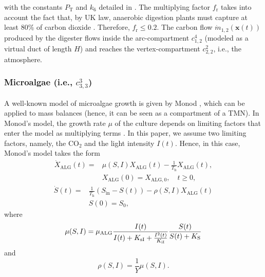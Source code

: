 \documentclass[lettersize,journal]{IEEEtran}
\begin{document}
with the constants $P_{\text{T}}$ and $k_6$ detailed in \cite{bernard2001dynamical,campos2019hybrid}. The multiplying factor $f_\text{r}$ takes into account the fact that, by UK law, anaerobic digestion plants must capture at least 80\% of carbon dioxide \cite{UKlawDigesters}. Therefore, $f_\text{r} \leq 0.2$. The carbon flow $\dot{m}_{1,2}(\bm{x}(t))$ produced by the digester flows inside the arc-compartment $c_{1,2}^4$ (modeled as a virtual duct of length $H$) and reaches the vertex-compartment $c^2_{2,2}$, i.e., the atmosphere. 






  
\subsubsection{Microalgae (i.e., $c^3_{3,3}$)}
A well-known model of microalgae growth is given by Monod \cite{vatcheva2006experiment}, which can be applied to mass balances \cite{marcos2004output} (hence, it can be seen as a compartment of a TMN). In Monod's model, the growth rate $\mu$ of the culture depends on limiting factors that enter the model as multiplying terms \cite{solimeno2015new}. In this paper, we assume two limiting factors, namely, the $\text{CO}_2$ and the light intensity $I(t)$. Hence, in this case, Monod's model takes the form     
\begin{equation}
\begin{aligned}
\dot{X}_{\text{ALG}}(t) = {} & \mu(S, I)X_{\text{ALG}}(t) - \frac{1}{T_{\text{h}}}X_{\text{ALG}}(t), \label{eq:MonodEq1}\\
& X_{\text{ALG}}(0) = X_{\text{ALG},0}, \quad t \geq 0,
\end{aligned}
\end{equation}
\begin{equation}
\begin{aligned}
\dot{S}(t) = {} & \frac{1}{T_{\text{h}}}\left(S_{\text{in}} - S(t) \right) - \rho(S, I)X_{\text{ALG}}(t)  \\
& S(0) = S_0,
\end{aligned}
\end{equation}
where
\begin{equation}\label{eq:MonodGrowthRate}
\mu(S, I) = \mu_{\text{ALG}} \frac{I(t)}{I(t) + K_{\text{sI}} + \frac{I^2(t)}{K_{\text{iI}}}}\frac{S(t)}{S(t) + K_{\text{S}}} \\
\end{equation}
and
\begin{equation}
\rho(S, I) = \frac{1}{Y} \mu(S, I). \label{eq:MonodEq4}
\end{equation}
\end{document}
